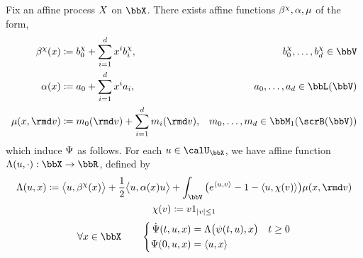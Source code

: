 \begin{theorem}
  Fix an affine process $X$ on $\stateSpace$.
  There exists affine functions $\beta^\chi, \alpha, \mu$ of the form,
  \begin{align}
    \affDrift^\trunc(\stateVar) 
    &\defeq \affDriftPart^\trunc_0 + \sum_{i=1}^d \stateVar^i \affDriftPart^\trunc_i,
    & \affDriftPart^\trunc_0, \ldots, \affDriftPart^\trunc_d \in \vecSpace \\
    \affDiff(\stateVar) 
    &\defeq \affDiffPart_0 + \sum_{i=1}^d \stateVar^i \affDiffPart_i,
    & \affDiffPart_0, \ldots, \affDiffPart_d \in \linSpace(\vecSpace) \\
    \affJump(\stateVar, \rmd\markVar) 
    &\defeq \affJumpPart_0(\rmd\markVar) + \sum_{i=1}^d \affJumpPart_i(\rmd\markVar),
    & \affJumpPart_0, \ldots, \affJumpPart_d \in \probSpace{\scrB(\vecSpace)}
  \end{align}
  which induce $\Psi$ as follows.
  For each $\momentVar \in \boundedSpace$, we have affine function $\ode(\momentVar, \cdot): \stateSpace \rightarrow \bbR$, defined by
  \begin{gather}
    \ode(\momentVar, \stateVar) 
    \defeq \bprj{\momentVar}{\affDrift^\trunc(\stateVar)} + \frac12\bprj{\momentVar}{\affDiff(\stateVar)\momentVar} + \int_\vecSpace \big( e^\prj{\momentVar}{\markVar} - 1 - \prj{\momentVar}{\trunc(\markVar)} \big) \affJump(\stateVar, \rmd\markVar) \\
    \trunc(\markVar) 
    \defeq \markVar1_{|\markVar|\leq 1}
  \end{gather}
  \begin{gather}
    \forall\stateVar \in \stateSpace \qquad \left\{\begin{aligned}
      \dot\aff(t, \momentVar, \stateVar) &= \ode\big(\affPart(t, \momentVar), \stateVar \big) & t \geq 0 \\
      \aff(0, \momentVar, \stateVar) &= \prj{\momentVar}{\stateVar}
    \end{aligned}\right. \\
  \end{gather}
\end{theorem}
